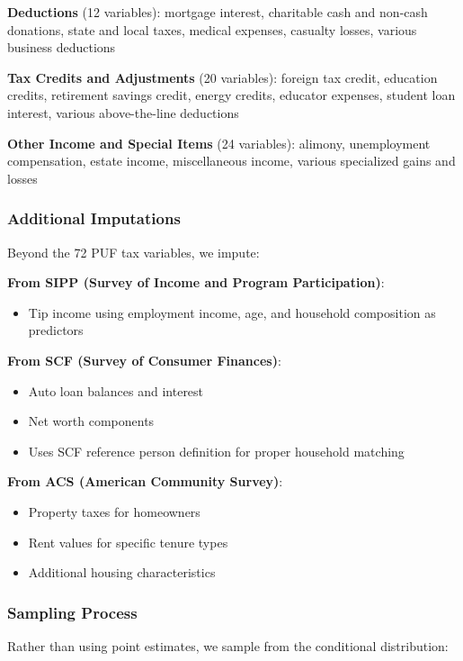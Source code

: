 {\textbf{Deductions} (12 variables): mortgage interest, charitable cash and non-cash donations, state and local taxes, medical expenses, casualty losses, various business deductions

\textbf{Tax Credits and Adjustments} (20 variables): foreign tax credit, education credits, retirement savings credit, energy credits, educator expenses, student loan interest, various above-the-line deductions

\textbf{Other Income and Special Items} (24 variables): alimony, unemployment compensation, estate income, miscellaneous income, various specialized gains and losses

\subsubsection{Additional Imputations}

Beyond the 72 PUF tax variables, we impute:

\textbf{From SIPP (Survey of Income and Program Participation)}:
\begin{itemize}
\item Tip income using employment income, age, and household composition as predictors
\end{itemize}

\textbf{From SCF (Survey of Consumer Finances)}:
\begin{itemize}
\item Auto loan balances and interest
\item Net worth components
\item Uses SCF reference person definition for proper household matching
\end{itemize}

\textbf{From ACS (American Community Survey)}:
\begin{itemize}
\item Property taxes for homeowners
\item Rent values for specific tenure types
\item Additional housing characteristics
\end{itemize}

\subsubsection{Sampling Process}

Rather than using point estimates, we sample from the conditional distribution:

}
